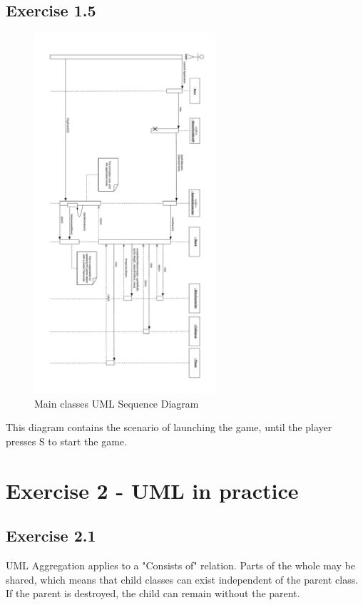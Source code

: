 \documentclass[10pt]{article}
\begin{document}
 \subsection*{Exercise 1.5} 
\begin{figure}[ht!]
\centering
\includegraphics[width=0.6\textwidth]{SI-Sequence.pdf}
\caption{Main classes UML Sequence Diagram}
\end{figure}
This diagram contains the scenario of launching the game, until the player presses S to start the game.
\pagebreak

\section{Exercise 2 - UML in practice}
\subsection{Exercise 2.1}
UML Aggregation applies to a "Consists of" relation.
Parts of the whole may be shared, which means that child classes can exist independent of the parent class.
If the parent is destroyed, the child can remain without the parent.
\end{document}
